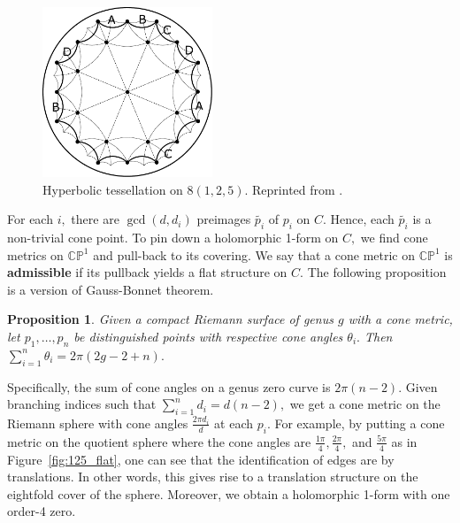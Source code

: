 \documentclass[12pt,reqno]{amsart}
\newtheorem*{proposition}{Proposition}
\theoremstyle{definition}
\theoremstyle{remark}
\begin{document}
\begin{figure}[htbp] 
   \centering
   \includegraphics[width=2in]{figures/125_base_.pdf} 
  \caption{Hyperbolic tessellation on $8(1, 2, 5).$ Reprinted from \cite{dami}.}
  \label{fig:125}
\end{figure}


For each $i,$ there are $\gcd(d, d_i)$ preimages $\widetilde{p_i}$ of $p_i$ on $C.$ Hence, each $\widetilde{p_i}$ is a non-trivial cone point. To pin down a holomorphic 1-form on $C,$ we find cone metrics on $\mathbb{C}\mathbb{P}^1$ and pull-back to its covering. We say that a cone metric on $\mathbb{C}\mathbb{P}^1$ is \textbf{admissible} if its pullback yields a flat structure on $C.$ The following proposition is a version of Gauss-Bonnet theorem.

\begin{proposition} Given a compact Riemann surface of genus $g$ with a cone metric, let $p_1, \ldots, p_n$ be distinguished points with respective cone angles $\theta_i.$ Then $\sum\limits_{i=1}^n \theta_i = 2 \pi (2 g - 2 + n).$
\end{proposition}

Specifically, the sum of cone angles on a genus zero curve is $2 \pi (n - 2).$ Given branching indices such that $\sum\limits_{i=1}^n d_i = d (n - 2),$ we get a cone metric on the Riemann sphere with cone angles $\frac{2 \pi d_i}{d}$ at each $p_i.$ For example, by putting a cone metric on the quotient sphere where the cone angles are $\frac{1 \pi}{4}, \frac{2 \pi}{4},$ and $\frac{5 \pi}{4}$ as in Figure~\ref{fig:125_flat}, one can see that the identification of edges are by translations. In other words, this gives rise to a translation structure on the eightfold cover of the sphere. Moreover, we obtain a holomorphic 1-form with one order-4 zero.
\end{document}
